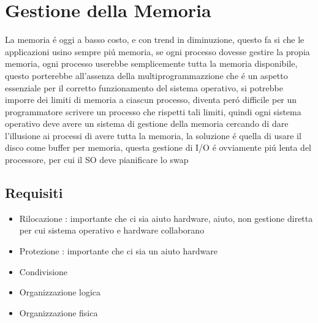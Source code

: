 
    \section{Gestione della Memoria}
    La memoria é oggi a basso costo, e con trend in diminuzione, questo fa si che le applicazioni usino sempre piú memoria,
    se ogni processo dovesse gestire la propia memoria, ogni processo userebbe semplicemente tutta la memoria disponibile,
    questo porterebbe all'assenza della multiprogrammazzione che é un aspetto essenziale per il corretto funzionamento del
    sistema operativo, si potrebbe imporre dei limiti di memoria a ciascun processo, diventa peró difficile per un programmatore
    scrivere un processo che rispetti tali limiti, quindi ogni sistema operativo deve avere un sistema di gestione della memoria
    cercando di dare l'illusione ai processi di avere tutta la memoria, la soluzione é quella di usare il disco come buffer
    per memoria, questa gestione di I/O é ovviamente piú lenta del processore, per cui il SO deve pianificare lo swap
    \subsection{Requisiti}
    \begin{itemize}
        \item Rilocazione : importante che ci sia aiuto hardware, aiuto, non gestione diretta per cui sistema operativo e hardware collaborano
        \item Protezione : importante che ci sia un aiuto hardware
        \item Condivisione
        \item Organizzazione logica
        \item Organizzazione fisica
    \end{itemize}
